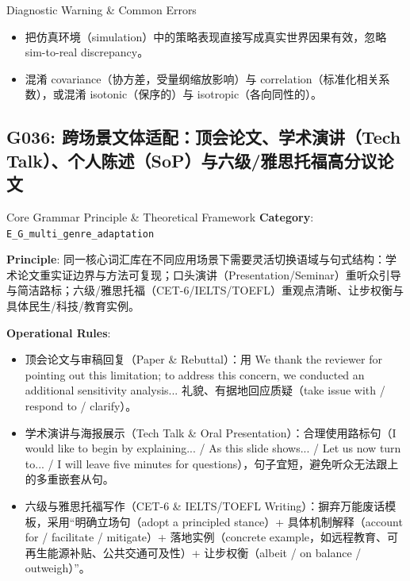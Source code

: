 \begin{TipBox}{Diagnostic Warning \& Common Errors}
\begin{itemize}[leftmargin=1.5em, itemsep=1pt]
  \item 把仿真环境（simulation）中的策略表现直接写成真实世界因果有效，忽略 sim-to-real discrepancy。
  \item 混淆 covariance（协方差，受量纲缩放影响）与 correlation（标准化相关系数），或混淆 isotonic（保序的）与 isotropic（各向同性的）。
\end{itemize}
\end{TipBox}
\vspace{6pt}
\subsection{G036: 跨场景文体适配：顶会论文、学术演讲（Tech Talk）、个人陈述（SoP）与六级/雅思托福高分议论文}\label{sec:rule:G036}
\begin{ConceptBox}{Core Grammar Principle \& Theoretical Framework}
\textbf{Category}: \texttt{E\_G\_multi\_genre\_adaptation}\par\vspace{3pt}
\textbf{Principle}: 同一核心词汇库在不同应用场景下需要灵活切换语域与句式结构：学术论文重实证边界与方法可复现；口头演讲（Presentation/Seminar）重听众引导与简洁路标；六级/雅思托福（CET-6/IELTS/TOEFL）重观点清晰、让步权衡与具体民生/科技/教育实例。\par\vspace{4pt}
\textbf{Operational Rules}:
\begin{itemize}[leftmargin=1.5em, itemsep=1pt]
  \item 顶会论文与审稿回复（Paper \& Rebuttal）：用 We thank the reviewer for pointing out this limitation; to address this concern, we conducted an additional sensitivity analysis... 礼貌、有据地回应质疑（take issue with / respond to / clarify）。
  \item 学术演讲与海报展示（Tech Talk \& Oral Presentation）：合理使用路标句（I would like to begin by explaining... / As this slide shows... / Let us now turn to... / I will leave five minutes for questions），句子宜短，避免听众无法跟上的多重嵌套从句。
  \item 六级与雅思托福写作（CET-6 \& IELTS/TOEFL Writing）：摒弃万能废话模板，采用“明确立场句（adopt a principled stance）+ 具体机制解释（account for / facilitate / mitigate）+ 落地实例（concrete example，如远程教育、可再生能源补贴、公共交通可及性）+ 让步权衡（albeit / on balance / outweigh）”。
\end{itemize}
\end{ConceptBox}
